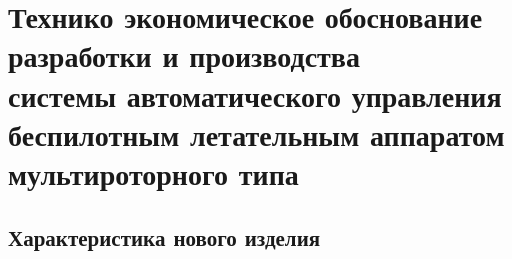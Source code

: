 
\section{Технико экономическое обоснование \\
  разработки и производства\\
  системы автоматического управления\\
  беспилотным летательным аппаратом\\
  мультироторного типа}






\subsection{Характеристика нового изделия}

